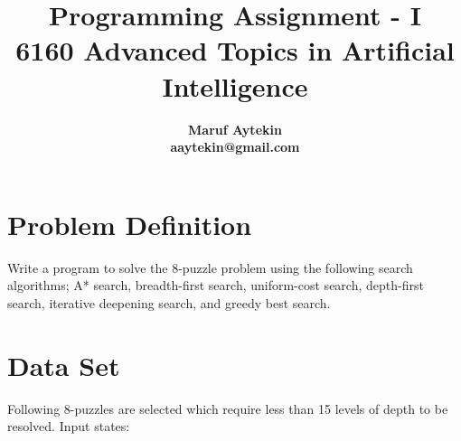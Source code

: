 \documentclass{article}
\title {Programming Assignment - I \\6160 Advanced Topics in Artificial Intelligence}
\author{\bf Maruf Aytekin \\
aaytekin@gmail.com}
\begin{document}
\maketitle

\section{Problem Definition}

Write a program to solve the 8-puzzle problem using the following search algorithms; 
A* search, 
breadth-first search,
uniform-cost search,
depth-first search,
iterative deepening search, and
greedy best search.

\section{Data Set}
Following 8-puzzles are selected which require less than 15 levels of depth to be resolved. Input states:
\end{document}
